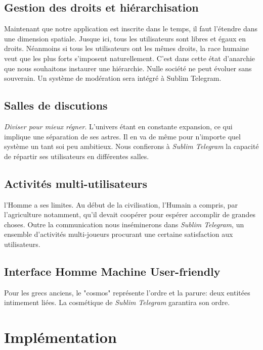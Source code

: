 \documentclass[a4paper, 12pt]{article}
\begin{document}
\subsection{Gestion des droits et hiérarchisation}
Maintenant que notre application est inscrite dans le temps, il faut l'étendre dans une dimension spatiale. Jusque ici, tous les utilisateurs sont libres et égaux en droits. Néanmoins si tous les utilisateurs ont les mêmes droits, la race humaine veut que les plus forts s'imposent naturellement. C'est dans cette état d'anarchie que nous souhaitons instaurer une hiérarchie. Nulle société ne peut évoluer sans souverain. Un système de modération sera intégré à Sublim Telegram.  
\subsection{Salles de discutions}
\emph{Diviser pour mieux régner}. 
L'univers étant en constante expansion, ce qui implique une séparation de ses astres. Il en va de même pour n'importe quel système un tant soi peu ambitieux. Nous confierons à \emph{Sublim Telegram} la capacité de répartir ses utilisateurs en différentes salles.  
\subsection{Activités multi-utilisateurs}
l'Homme a ses limites. Au début de la civilisation, l'Humain a compris, par l'agriculture notamment, qu'il devait coopérer pour espérer accomplir de grandes choses. Outre la communication nous inséminerons dans \emph{Sublim Telegram}, un ensemble d'activités multi-joueurs procurant une certaine satisfaction aux utilisateurs.
\subsection{Interface Homme Machine User-friendly}
Pour les grecs anciens, le "cosmos" représente l'ordre et la parure: deux entitées intimement liées. La cosmétique de \emph{Sublim Telegram} garantira son ordre.
\section{Implémentation}
\end{document}
